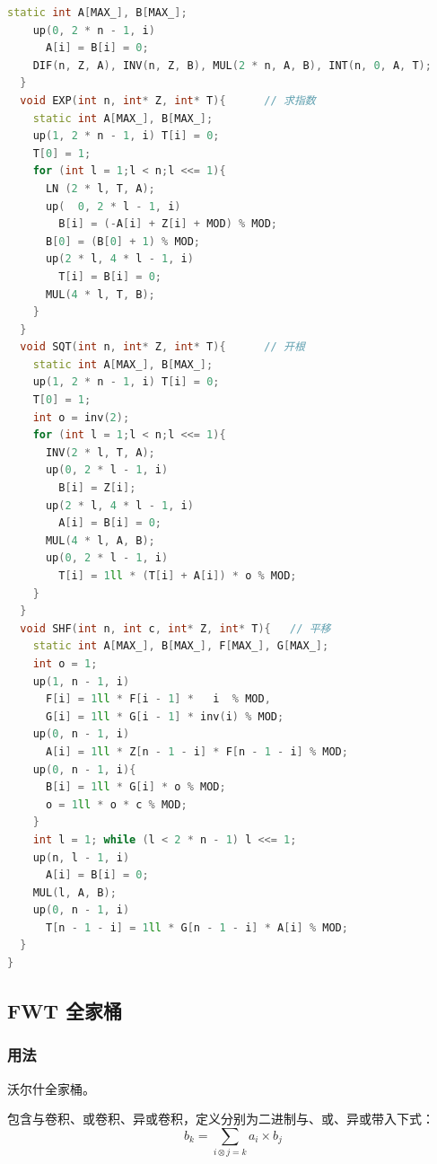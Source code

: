 \documentclass[10pt]{ctexart}
\begin{document}
\begin{multicols}{3}
\begin{lstlisting}[language={C++}]
    static int A[MAX_], B[MAX_];
    up(0, 2 * n - 1, i)
      A[i] = B[i] = 0;
    DIF(n, Z, A), INV(n, Z, B), MUL(2 * n, A, B), INT(n, 0, A, T);
  }
  void EXP(int n, int* Z, int* T){      // 求指数
    static int A[MAX_], B[MAX_];
    up(1, 2 * n - 1, i) T[i] = 0;
    T[0] = 1;
    for (int l = 1;l < n;l <<= 1){
      LN (2 * l, T, A);
      up(  0, 2 * l - 1, i)
        B[i] = (-A[i] + Z[i] + MOD) % MOD;
      B[0] = (B[0] + 1) % MOD;
      up(2 * l, 4 * l - 1, i)
        T[i] = B[i] = 0;
      MUL(4 * l, T, B);
    }
  }
  void SQT(int n, int* Z, int* T){      // 开根
    static int A[MAX_], B[MAX_];
    up(1, 2 * n - 1, i) T[i] = 0;
    T[0] = 1;
    int o = inv(2);
    for (int l = 1;l < n;l <<= 1){
      INV(2 * l, T, A);
      up(0, 2 * l - 1, i)
        B[i] = Z[i];
      up(2 * l, 4 * l - 1, i)
        A[i] = B[i] = 0;
      MUL(4 * l, A, B);
      up(0, 2 * l - 1, i)
        T[i] = 1ll * (T[i] + A[i]) * o % MOD;
    }
  }
  void SHF(int n, int c, int* Z, int* T){   // 平移
    static int A[MAX_], B[MAX_], F[MAX_], G[MAX_];
    int o = 1;
    up(1, n - 1, i)
      F[i] = 1ll * F[i - 1] *   i  % MOD,
      G[i] = 1ll * G[i - 1] * inv(i) % MOD;
    up(0, n - 1, i)
      A[i] = 1ll * Z[n - 1 - i] * F[n - 1 - i] % MOD;
    up(0, n - 1, i){
      B[i] = 1ll * G[i] * o % MOD;
      o = 1ll * o * c % MOD;
    }
    int l = 1; while (l < 2 * n - 1) l <<= 1;
    up(n, l - 1, i)
      A[i] = B[i] = 0; 
    MUL(l, A, B);
    up(0, n - 1, i)
      T[n - 1 - i] = 1ll * G[n - 1 - i] * A[i] % MOD;
  }
}
\end{lstlisting}

    \subsection{FWT 全家桶}\label{fwt-ux5168ux5bb6ux6876}

    \subsubsection{用法}\label{ux7528ux6cd5-14}

    沃尔什全家桶。

    包含与卷积、或卷积、异或卷积，定义分别为二进制与、或、异或带入下式：\[b_k = \sum_{i \otimes j = k} a_i \times b_j\]


\end{multicols}
\end{document}
